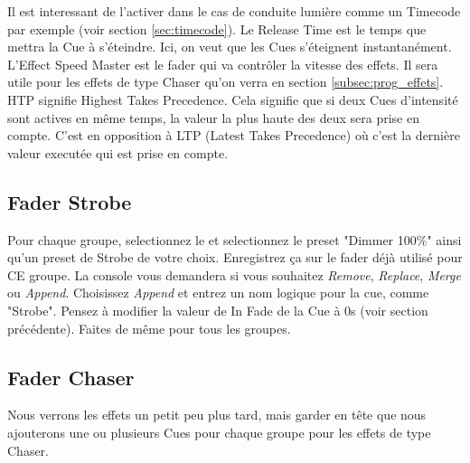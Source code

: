 Il est interessant de l'activer dans le cas de conduite lumière comme un Timecode par exemple (voir section \ref{sec:timecode}).
\newline
Le Release Time est le temps que mettra la Cue à s'éteindre. Ici, on veut que les Cues s'éteignent instantanément.
\newline
L'Effect Speed Master est le fader qui va contrôler la vitesse des effets. Il sera utile pour les effets de type Chaser qu'on verra en section \ref{subsec:prog_effets}.
\newline
HTP signifie Highest Takes Precedence. Cela signifie que si deux Cues d'intensité sont actives en même temps, la valeur la plus haute des deux sera prise en compte.
C'est en opposition à LTP (Latest Takes Precedence) où c'est la dernière valeur executée qui est prise en compte.

\subsection{Fader Strobe}
\label{subsec:fader_strobe}

Pour chaque groupe, selectionnez le et selectionnez le preset "Dimmer 100\%" ainsi qu'un preset de Strobe de votre choix.
Enregistrez ça sur le fader déjà utilisé pour CE groupe. La console vous demandera si vous souhaitez \textit{Remove}, \textit{Replace}, \textit{Merge} ou \textit{Append}.
Choisissez \textit{Append} et entrez un nom logique pour la cue, comme "Strobe".
\newline
Pensez à modifier la valeur de In Fade de la Cue à 0s (voir section précédente).
\newline
\newline
Faites de même pour tous les groupes.

\subsection{Fader Chaser}
\label{subsec:fader_chaser}

Nous verrons les effets un petit peu plus tard, mais garder en tête que nous ajouterons une ou plusieurs Cues pour chaque groupe pour les effets de type Chaser.
